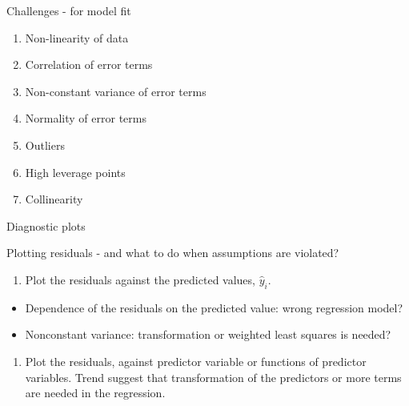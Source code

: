 \documentclass[ignorenonframetext,]{beamer}
\providecommand{\tightlist}{%
  \setlength{\itemsep}{0pt}\setlength{\parskip}{0pt}}
\begin{document}
\begin{frame}

\begin{block}{Challenges - for model fit}

\begin{enumerate}
\def\labelenumi{\arabic{enumi}.}
\tightlist
\item
  Non-linearity of data
\item
  Correlation of error terms
\item
  Non-constant variance of error terms
\item
  Normality of error terms
\item
  Outliers
\item
  High leverage points
\item
  Collinearity
\end{enumerate}

\end{block}

\end{frame}

\begin{frame}

\begin{block}{Diagnostic plots}

\begin{block}{Plotting residuals - and what to do when assumptions are
violated?}

\begin{enumerate}
\def\labelenumi{\arabic{enumi}.}
\tightlist
\item
  Plot the residuals against the predicted values, \(\hat{y}_i\).
\end{enumerate}

\begin{itemize}
\tightlist
\item
  Dependence of the residuals on the predicted value: wrong regression
  model?
\item
  Nonconstant variance: transformation or weighted least squares is
  needed?
\end{itemize}

\begin{enumerate}
\def\labelenumi{\arabic{enumi}.}
\setcounter{enumi}{1}
\tightlist
\item
  Plot the residuals, against predictor variable or functions of
  predictor variables. Trend suggest that transformation of the
  predictors or more terms are needed in the regression.
\end{enumerate}

\end{block}

\end{block}

\end{frame}
\end{document}
